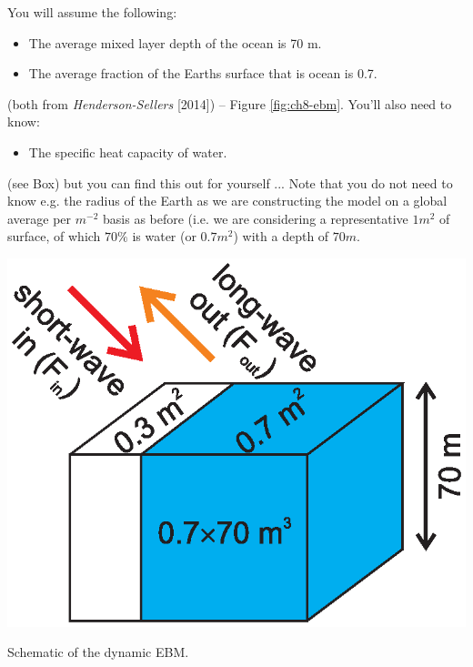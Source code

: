 \documentclass{tufte-book} %
\begin{document}
You will  assume the following:
\begin{itemize}[noitemsep]
\setlength{\itemindent}{.2in}
\item The average mixed layer depth of the ocean is 70 m.
\item The average fraction of the Earths surface that is ocean is 0.7.
\end{itemize}
(both from \textit{Henderson-Sellers} [2014]) -- Figure \ref{fig:ch8-ebm}. You'll also need to know:
\begin{itemize}[noitemsep]
\setlength{\itemindent}{.2in}
\item The specific heat capacity of water.
\end{itemize}
(see Box) but you can find this out for yourself ... Note that you do not need to know e.g. the radius of the Earth as we are constructing the model on a global average per \(m^{-2}\) basis as before (i.e. we are considering a representative \(1 m^{2}\) of surface, of which \(70\%\) is water (or \(0.7 m^{2}\)) with a depth of \(70m\).

\begin{marginfigure}[-5.0in]
\includegraphics[width=\linewidth]{ch8-ebm.eps}
\caption{Schematic of the dynamic EBM.}
\label{fig:ch8-ebm}
\end{marginfigure}
\end{document}
